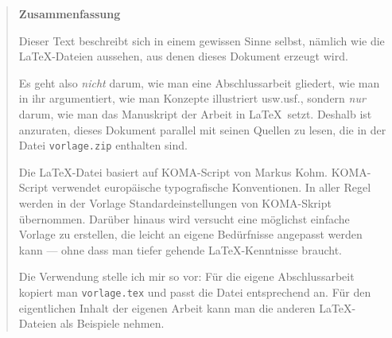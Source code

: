 \documentclass[%
	BCOR=8.25mm,         %
	DIV=12,              %
	parskip=half,				 %
	bibliography=totoc,	 %
	headsepline=on,      %
	]{scrbook}
\begin{document}
\pagestyle{empty}
\begin{quote}
	\vspace*{4cm}

	\begin{center}
		\textbf{\Large\sffamily Zusammenfassung}
	\end{center}

	Dieser Text beschreibt sich in einem gewissen Sinne selbst, nämlich
	wie die \LaTeX-Dateien aussehen, aus denen dieses Dokument erzeugt wird.

	Es geht also \emph{nicht} darum, wie man eine Abschlussarbeit
	gliedert, wie man in ihr argumentiert, wie man Konzepte illustriert
	usw.usf., sondern \emph{nur} darum, wie man das Manuskript der Arbeit
	in \LaTeX\ setzt. Deshalb ist anzuraten, dieses Dokument parallel mit
	seinen Quellen zu lesen, die in der Datei \verb=vorlage.zip= enthalten
	sind.

	Die \LaTeX-Datei basiert auf KOMA-Script von Markus Kohm. KOMA-Script
	verwendet europäische typografische Konventionen. In aller Regel
	werden in der Vorlage Standardeinstellungen von KOMA-Skript
	übernommen. Darüber hinaus wird versucht eine möglichst einfache
	Vorlage zu erstellen, die leicht an eigene Bedürfnisse angepasst
	werden kann --- ohne dass man tiefer gehende \LaTeX-Kenntnisse braucht.

	Die Verwendung stelle ich mir so vor: Für die eigene Abschlussarbeit
	kopiert man \verb=vorlage.tex= und passt die Datei entsprechend an.
	Für den eigentlichen Inhalt der eigenen Arbeit kann man die anderen
	\LaTeX-Dateien als Beispiele nehmen.
	
\end{quote}
\cleardoubleemptypage

\tableofcontents
\listoffigures
\listoftables
\lstlistoflistings

\mainmatter 
\pagestyle{headings}

%
%
%

\backmatter 

\appendix
%
%
\end{document}
